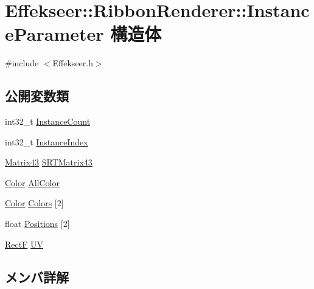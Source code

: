 \hypertarget{struct_effekseer_1_1_ribbon_renderer_1_1_instance_parameter}{}\section{Effekseer\+:\+:Ribbon\+Renderer\+:\+:Instance\+Parameter 構造体}
\label{struct_effekseer_1_1_ribbon_renderer_1_1_instance_parameter}


{\ttfamily \#include $<$Effekseer.\+h$>$}

\subsection*{公開変数類}
\begin{DoxyCompactItemize}
\item 
int32\+\_\+t \mbox{\hyperlink{struct_effekseer_1_1_ribbon_renderer_1_1_instance_parameter_a2af6b88f0a8ed75b33fed94f38934353}{Instance\+Count}}
\item 
int32\+\_\+t \mbox{\hyperlink{struct_effekseer_1_1_ribbon_renderer_1_1_instance_parameter_a39fb064c24fef06eee1c4deaad15e027}{Instance\+Index}}
\item 
\mbox{\hyperlink{struct_effekseer_1_1_matrix43}{Matrix43}} \mbox{\hyperlink{struct_effekseer_1_1_ribbon_renderer_1_1_instance_parameter_afc0524469889f23dec49ef302aa44c2b}{S\+R\+T\+Matrix43}}
\item 
\mbox{\hyperlink{struct_effekseer_1_1_color}{Color}} \mbox{\hyperlink{struct_effekseer_1_1_ribbon_renderer_1_1_instance_parameter_a87e802bfc8b166a32fef0b4971807a41}{All\+Color}}
\item 
\mbox{\hyperlink{struct_effekseer_1_1_color}{Color}} \mbox{\hyperlink{struct_effekseer_1_1_ribbon_renderer_1_1_instance_parameter_a1f1096580cd8dcc15461d1a07bf011d6}{Colors}} \mbox{[}2\mbox{]}
\item 
float \mbox{\hyperlink{struct_effekseer_1_1_ribbon_renderer_1_1_instance_parameter_a2726f42a3ce9e902cc001b2fb0bb4fab}{Positions}} \mbox{[}2\mbox{]}
\item 
\mbox{\hyperlink{struct_effekseer_1_1_rect_f}{RectF}} \mbox{\hyperlink{struct_effekseer_1_1_ribbon_renderer_1_1_instance_parameter_ae15daebe5ddca6f33083976153344531}{UV}}
\end{DoxyCompactItemize}


\subsection{メンバ詳解}
\mbox{\label{struct_effekseer_1_1_ribbon_renderer_1_1_instance_parameter_a87e802bfc8b166a32fef0b4971807a41}} 
